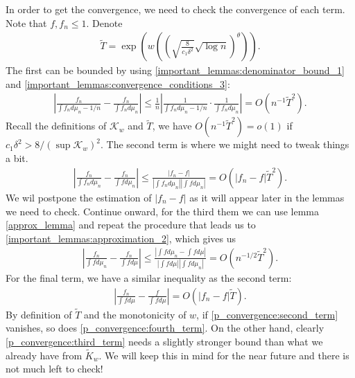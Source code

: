 \documentclass[10pt]{article}
\begin{document}
In order to get the convergence, we need to check the convergence of each term. Note that $f,f_n \leq 1$. Denote
\begin{align}
  \tilde{T} = \exp \left(w\left(\left(\sqrt{\frac{8}{c_1\delta^2}}\sqrt{\log n} \right)^{\theta} \right) \right).
\end{align}The first can be bounded by using \eqref{important_lemmas:denominator_bound_1} and \eqref{important_lemmas:convergence_conditions_3}:
\begin{align} \label{p_convergence:first_term}
  \left|\frac{f_n}{\int f_n d\mu_n - 1/n} - \frac{f_n}{\int f_n d \mu_n}\right| \leq \frac{1}{n} \left|\frac{1}{\int f_n d\mu_n - 1/n} \cdot \frac{1}{\int f_n d\mu_n}\right|= O(n^{-1}\tilde{T}^2).
\end{align}
Recall the definitions of $\mathcal{K}_w$ and $\tilde{T}$, we have $O(n^{-1}\tilde{T}^2) = o(1)$ if $c_1\delta^2 > 8/(\sup \mathcal{K}_w)^2$. The second term is where we might need to tweak things a bit.
\begin{align} \label{p_convergence:second_term}
  \left|\frac{f_n}{\int f_n d\mu_n} - \frac{f_n}{\int f d \mu_n}\right| \leq \frac{|f_n-f|}{|\int f_n d\mu_n||\int f d\mu_n|} = O(|f_n-f|\tilde{T}^2).
\end{align}
We wil postpone the estimation of $|f_n-f|$ as it will appear later in the lemmas we need to check. Continue onward, for the third them we can use lemma \ref{approx_lemma} and repeat the procedure that leads us to \eqref{important_lemmas:approximation_2}, which gives us
\begin{align} \label{p_convergence:third_term}
  \left|\frac{f_n}{\int f d\mu_n} - \frac{f_n}{\int f d \mu}\right| \leq \frac{|\int f d \mu_n - \int f d \mu|}{|\int f d \mu||\int f d \mu_n|} = O(n^{-1/2}\tilde{T}^2).
\end{align}
For the final term, we have a similar inequality as the second term:
\begin{align} \label{p_convergence:fourth_term}
  \left|\frac{f_n}{\int f d\mu} - \frac{f}{\int f d \mu}\right| = O(|f_n-f|\tilde{T}).
\end{align}
By definition of $\tilde{T}$ and the monotonicity of $w$, if \eqref{p_convergence:second_term} vanishes, so does \eqref{p_convergence:fourth_term}. On the other hand, clearly \eqref{p_convergence:third_term} needs a slightly stronger bound than what we already have from $\tilde{K}_w$. We will keep this in mind for the near future and there is not much left to check!
\end{document}
